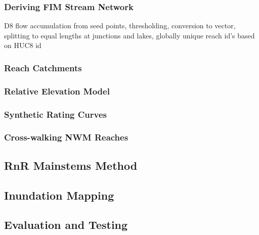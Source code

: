 \subsubsection{Deriving FIM Stream Network}

D8 flow accumulation from seed points, thresholding, conversion to vector, splitting to equal lengths at junctions and lakes, globally unique reach id's based on HUC8 id
\cite{wallis2009parallel}

\subsubsection{Reach Catchments}

\subsubsection{Relative Elevation Model}

\subsubsection{Synthetic Rating Curves}

\subsubsection{Cross-walking NWM Reaches}

\subsection{RnR Mainstems Method}

\subsection{Inundation Mapping}

\subsection{Evaluation and Testing}

